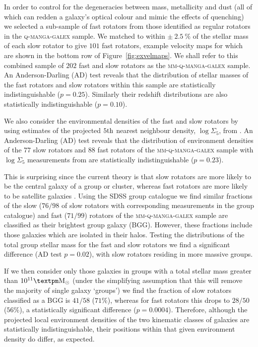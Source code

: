 \documentclass[useAMS,usenatbib]{mn2e}
\begin{document}
In order to control for the degeneracies between mass, metallicity and dust (all of which can redden a galaxy's optical colour and mimic the effects of quenching) we selected a sub-sample of fast rotators from those identified as regular rotators in the \textsc{q-manga-galex} sample. We matched to within $\pm~2.5~\%$ of the stellar mass of each slow rotator to give $101$ fast rotators, example velocity maps for which are shown in the bottom row of Figure~\ref{fig:exvelmaps}. We shall refer to this combined sample of $202$ fast and slow rotators as the \textsc{mm-q-manga-galex} sample. An Anderson-Darling (AD) test reveals that the distribution of stellar masses of the fast rotators and slow rotators within this sample are statistically indistinguishable ($p=0.25$). Similarly their redshift distributions are also statistically indistinguishable ($p=0.10$).

We also consider the environmental densities of the fast and slow rotators by using estimates of the projected $5\rm{th}$ nearest neighbour density,  $\log\Sigma_5$, from \cite{bamford09}. An Anderson-Darling (AD) test reveals that the distribution of environment densities of the $77$ slow rotators and $88$ fast rotators of the \textsc{mm-q-manga-galex} sample with $\log\Sigma_5$ measurements from \cite{bamford09} are statistically indistinguishable ($p=0.23$). 

This is surprising since the current theory is that slow rotators are more likely to be the central galaxy of a group or cluster, whereas fast rotators are more likely to be satellite galaxies \citep{cappellari11, deugenio13, houghton13, scott14}. Using the \cite{yang09} SDSS group catalogue we find similar fractions of the slow ($76/98$ of slow rotators with corresponding measurements in the \citeauthor{yang09} group catalogue) and fast ($71/99$) rotators of the \textsc{mm-q-manga-galex} sample are classified as their brightest group galaxy (BGG). However, these fractions include those galaxies which are isolated in their halos. Testing the distributions of the total group stellar mass for the fast and slow rotators we find a significant difference (AD test $p=0.02$), with slow rotators residing in more massive groups. 

If we then consider only those galaxies in groups with a total stellar mass greater than $10^{11}±\rm{M}_{\odot}$ (under the simplifying assumption that this will remove the majority of single galaxy `groups') we find the fraction of slow rotators classified as a BGG is $41/58$ ($71\%$), whereas for fast rotators this drops to $28/50$ ($56\%$), a statistically significant difference ($p=0.0004$). Therefore, although the projected local environment densities of the two kinematic classes of galaxies are statistically indistinguishable, their positions within that given environment density do differ, as expected. 
\end{document}

